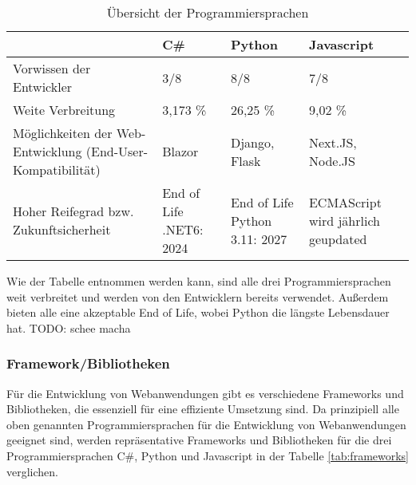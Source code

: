 \begin{table}
  \begin{tabular} {|m{3cm}|m{3cm}|m{3cm}|m{3cm}|}
    \hline
    & C\# & Python & Javascript \\
    \hline
    Vorwissen der Entwickler & 3/8 & 8/8 & 7/8 \\
    \hline
    Weite Verbreitung & 3,173 \%\cite{noauthor_github_nodate} & 26,25 \%\cite{noauthor_github_nodate} & 9,02 \%\cite{noauthor_github_nodate} \\
    \hline
    Möglichkeiten der Web-Entwicklung (End-User-Kompatibilität) & Blazor & Django, Flask & Next.JS, Node.JS \\
    \hline
    Hoher Reifegrad bzw. Zukunftsicherheit & End of Life .NET6: 2024\cite{noauthor_.net_nodate} & End of Life Python 3.11: 2027\cite{noauthor_python_nodate} & ECMAScript wird jährlich geupdated\cite{noauthor_javascript_nodate} \\
    \hline
  \end{tabular}
  \caption{Übersicht der Programmiersprachen}
  \label{tab:programming_languages}
\end{table}

Wie der Tabelle entnommen werden kann, sind alle drei Programmiersprachen weit verbreitet und werden von den Entwicklern bereits verwendet.
Außerdem bieten alle eine akzeptable End of Life, wobei Python die längste Lebensdauer hat.
TODO: schee macha




\subsubsection*{Framework/Bibliotheken}

Für die Entwicklung von Webanwendungen gibt es verschiedene Frameworks und Bibliotheken, die essenziell für eine effiziente Umsetzung sind.
Da prinzipiell alle oben genannten Programmiersprachen für die Entwicklung von Webanwendungen geeignet sind, werden repräsentative Frameworks und Bibliotheken für die drei Programmiersprachen C\#, Python und Javascript in der Tabelle \ref{tab:frameworks} verglichen.

